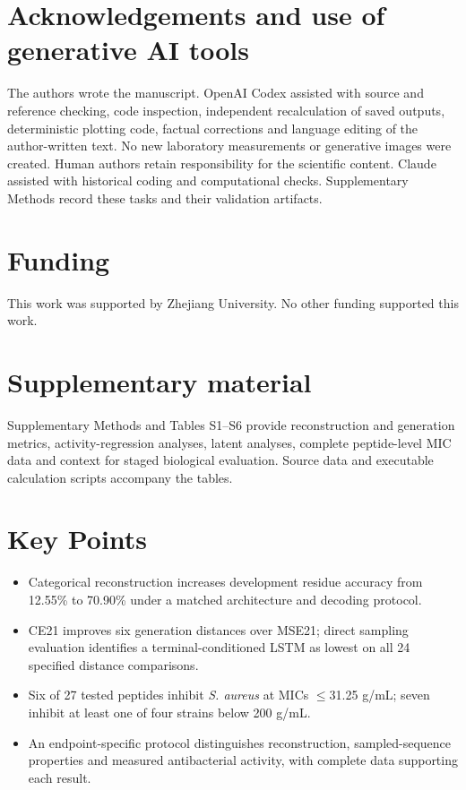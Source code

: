 \documentclass[unnumsec,webpdf,contemporary,large]{oup-authoring-template}
\begin{document}
\section*{Acknowledgements and use of generative AI tools}

The authors wrote the manuscript. OpenAI Codex assisted with source and reference checking, code inspection, independent recalculation of saved outputs, deterministic plotting code, factual corrections and language editing of the author-written text. No new laboratory measurements or generative images were created. Human authors retain responsibility for the scientific content. Claude assisted with historical coding and computational checks. Supplementary Methods record these tasks and their validation artifacts.

\section*{Funding}

This work was supported by Zhejiang University. No other funding supported this work.

\section*{Supplementary material}
Supplementary Methods and Tables S1--S6 provide reconstruction and generation metrics, activity-regression analyses, latent analyses, complete peptide-level MIC data and context for staged biological evaluation. Source data and executable calculation scripts accompany the tables.

\noindent\begin{minipage}{\columnwidth}
\section*{Key Points}
\begin{itemize}
\item Categorical reconstruction increases development residue accuracy from 12.55\% to 70.90\% under a matched architecture and decoding protocol.
\item CE21 improves six generation distances over MSE21; direct sampling evaluation identifies a terminal-conditioned LSTM as lowest on all 24 specified distance comparisons.
\item Six of 27 tested peptides inhibit \textit{S. aureus} at MICs $\leq$31.25 \textmu{}g/mL; seven inhibit at least one of four strains below 200 \textmu{}g/mL.
\item An endpoint-specific protocol distinguishes reconstruction, sampled-sequence properties and measured antibacterial activity, with complete data supporting each result.
\end{itemize}
\end{minipage}
\end{document}
